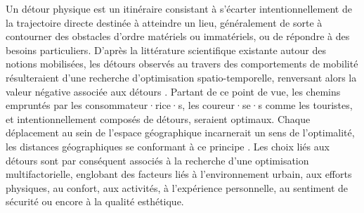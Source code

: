 \begin{refsegment}
Un \gls{détour} physique est un itinéraire consistant à s'écarter intentionnellement de la trajectoire directe destinée à atteindre un lieu, généralement de sorte à contourner des obstacles d'ordre matériels ou immatériels, ou de répondre à des besoins particuliers. D'après la littérature scientifique existante autour des notions mobilisées, les détours observés au travers des comportements de mobilité résulteraient d'une recherche d'optimisation spatio-temporelle, renversant alors la valeur négative associée aux détours \textcolor{blue}{\autocite[459]{lhostis_detour_2017}}. Partant de ce point de vue, les chemins empruntés par les consommateur·rice·s, les coureur·se·s comme les touristes, et intentionnellement composés de détours, seraient optimaux. Chaque déplacement au sein de l'espace géographique incarnerait un sens de l'optimalité, les distances géographiques se conformant à ce principe \textcolor{blue}{\autocite[2]{lhostis_all_2020}}. Les choix liés aux détours sont par conséquent associés à la recherche d'une optimisation multifactorielle, englobant des facteurs liés à l'environnement urbain, aux efforts physiques, au confort, aux activités, à l'expérience personnelle, au sentiment de sécurité ou encore à la qualité esthétique.%


\end{refsegment}
